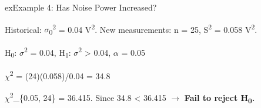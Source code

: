 \begin{PSbox}[unbreakable]{ex}{Example 4: Has Noise Power Increased?}

Historical: \ensuremath{\sigma}\textsubscript{0}\textsuperscript{2} = 0.04 V\textsuperscript{2}. New measurements: n = 25, S\textsuperscript{2} = 0.058 V\textsuperscript{2}.

H\textsubscript{0}: \ensuremath{\sigma}\textsuperscript{2} = 0.04, H\textsubscript{1}: \ensuremath{\sigma}\textsuperscript{2} \textgreater{} 0.04, \ensuremath{\alpha} = 0.05

\ensuremath{\chi}\textsuperscript{2} = (24)(0.058)/0.04 = 34.8

\ensuremath{\chi}\textsuperscript{2}\_\{0.05, 24\} = 36.415. Since 34.8 \textless{} 36.415 \ensuremath{\to} \textbf{Fail to reject H\textsubscript{0}.}

\end{PSbox}


